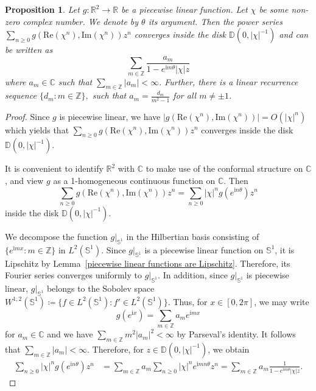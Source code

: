 \documentclass[11pt,a4paper]{article}
\theoremstyle{plain}
\newtheorem{proposition}[theorem]{Proposition}
\theoremstyle{remark}
\theoremstyle{custombold}
\newcommand{\irm}{\mathrm{i}}
\begin{document}
\begin{proposition}\label{Fourier coefficients of continuous piecewise linear functions}
     Let $g\colon \mathbb R^2\rightarrow \mathbb R$ be a piecewise linear function. Let $\chi$ be some non-zero complex number. We denote by $\theta$ its argument. Then the power series $\sum_{n\geq0}g(\mathrm{Re}(\chi^n),\mathrm{Im}(\chi^n))z^n$ converges inside the disk $\mathbb D(0,|\chi|^{-1})$ and can be written as 
     $$\sum_{m\in\mathbb Z}\frac{a_m}{1-e^
    {\irm m\theta}|\chi|z}$$
     where $a_m\in\mathbb C$ such that $\sum_{m\in\mathbb Z}|a_m|<\infty$. Further, there is a linear recurrence sequence $\{d_m:m\in\mathbb Z\},$ such that $a_m=\frac{d_m}{m^2-1}$ for all $m\neq\pm1$. \end{proposition}
\begin{proof} 
  Since $g$ is piecewise linear, we have $|g(\mathrm{Re}(\chi^n),\mathrm{Im}(\chi^n))|= O(|\chi|^n)$ which yields that $\sum_{n\geq0}g(\mathrm{Re}(\chi^n),\mathrm{Im}(\chi^n))z^n$ converges inside the disk $\mathbb D(0,|\chi|^{-1})$. 
  
  It is convenient to identify $\mathbb R^2$ with $\mathbb C$ to make use of the conformal structure on $\mathbb C$, and view $g$ as a  1-homogeneous continuous function on $\mathbb C$. Then  $$\sum_{n\geq0}g(\mathrm{Re}(\chi^n),\mathrm{Im}(\chi^n))z^n=\sum_{n\geq0}|\chi|^ng(e^{\irm n\theta})z^n$$
   inside the disk $\mathbb D(0,|\chi|^{-1}).$

We decompose the function $g|_{\mathbb S^1}$ in the Hilbertian basis consisting of $\{e^{\irm mx}:m\in\mathbb Z\}$ in $L^2(\mathbb S^1)$. Since $g|_{\mathbb S^1}$ is a piecewise linear function on $\mathbb S^1$, it is Lipschitz by Lemma~\ref{piecewise linear functions are Lipschitz}. Therefore, its Fourier series converges uniformly to $g|_{\mathbb S^1}$. In addition, since $g|_{\mathbb S^1}$ is piecewise linear, $g|_{\mathbb S^1}$ belongs to the Sobolev space $W^{1,2}(\mathbb S^1)\coloneqq \{f\in L^2(\mathbb S^1):f'\in L^2(\mathbb S^1) \}$. Thus, for $x\in[0,2\pi]$, we may write $$g(e^{\irm  x})=\sum_{m\in\mathbb Z}a_{m}e^{\irm mx}$$
for $a_m\in\mathbb C$ and we have $\sum_{m\in\mathbb Z}m^2|a_m|^2<\infty$ by Parseval's identity. It follows that $\sum_{m\in\mathbb Z}|a_m|<\infty$. Therefore, for $z\in\mathbb{D}(0,|\chi|^{-1})$, we obtain
\begin{align*}
    \sum_{n\geq0}|\chi|^ng(e^{\irm n\theta})z^n&=\sum_{m\in\mathbb Z}a_m\sum_{n\geq0}|\chi|^ne^{\irm mn\theta}z^n=\sum_{m\in\mathbb Z}a_m\frac{1}{1-e^
    {\irm m\theta}|\chi|z}.
\end{align*} 


\end{proof}
\end{document}
